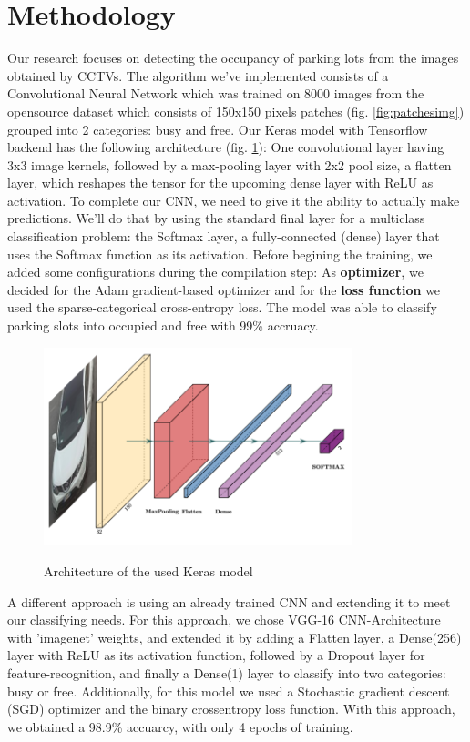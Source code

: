 \documentclass[12pt]{article}
\begin{document}
\section{Methodology}
Our research focuses on detecting the occupancy of parking lots from the images obtained by CCTVs.
The algorithm we've implemented consists of a Convolutional Neural Network which was trained on 8000 images from the opensource 
\cite{cnrpark} dataset which consists of 150x150 pixels patches (fig. \ref{fig:patchesimg}) grouped into 2 categories: busy and free.
Our Keras model with Tensorflow backend has the following architecture (fig. \ref{fig:architectureimg}): One convolutional layer having 3x3 image kernels,
followed by a max-pooling layer with 2x2 pool size, a flatten layer, which reshapes the tensor for the upcoming dense layer 
with ReLU as activation. To complete our CNN, we need to give it the ability to actually make predictions. 
We’ll do that by using the standard final layer for a multiclass classification problem: 
the Softmax layer, a fully-connected (dense) layer that uses the Softmax function as its activation.
Before begining the training, we added some configurations during the compilation step:
As \textbf{optimizer}, we decided for the Adam gradient-based optimizer and for the \textbf{loss function} 
we used the sparse-categorical cross-entropy loss. The model was able to classify parking slots into occupied and free with 99\% accruacy.

\begin{figure}
\caption{Architecture of the used Keras model}
\includegraphics[width=0.8\textwidth]{Architecture}
\label{fig:architectureimg}
\end{figure}

\par
A different approach is using an already trained CNN and extending it to meet our classifying needs.
For this approach, we chose VGG-16 CNN-Architecture with 'imagenet' weights, and extended it by adding a Flatten layer, a Dense(256) layer with ReLU as its activation
function, followed by a Dropout layer for feature-recognition, and finally a Dense(1) layer to classify into two categories: busy or free.
Additionally, for this model we used a Stochastic gradient descent (SGD) optimizer and the binary crossentropy loss function.
With this approach, we obtained a 98.9\% accuarcy, with only 4 epochs of training.
\end{document}
